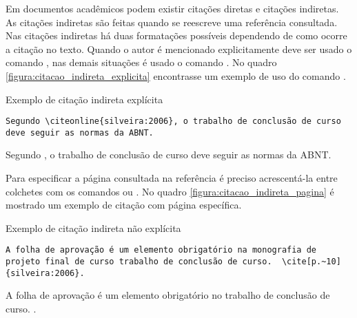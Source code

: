 Em documentos acadêmicos podem existir citações diretas e citações indiretas. As citações indiretas são feitas quando se reescreve uma referência consultada. Nas citações indiretas há duas formatações possíveis dependendo de como ocorre a citação no texto. Quando o autor é mencionado explicitamente  deve ser usado o comando , nas demais situações é usado o comando . No quadro \ref{figura:citacao_indireta_explicita} encontrasse um  exemplo de uso do comando .

\begin{quadro}[htb]
\caption{Exemplo de citação indireta explícita} \label{figura:citacao_indireta_explicita}
\hrulefill

\lstset{language=Tex, breaklines=true}
\begin{lstlisting}
Segundo \citeonline{silveira:2006}, o trabalho de conclusão de curso deve seguir as normas da ABNT.
\end{lstlisting}

\hrulefill

Segundo , o trabalho de conclusão de curso deve seguir as normas da ABNT.

\hrulefill

\end{quadro}

Para especificar a página consultada na referência é preciso acrescentá-la entre colchetes com os comandos  ou . No quadro \ref{figura:citacao_indireta_pagina} é mostrado um exemplo de citação com página específica.

\begin{quadro}[htb]
\caption{Exemplo de citação indireta não explícita} \label{figura:citacao_indireta_pagina}
\hrulefill

\lstset{language=Tex, breaklines=true}
\begin{lstlisting}
A folha de aprovação é um elemento obrigatório na monografia de projeto final de curso trabalho de conclusão de curso.  \cite[p.~10]{silveira:2006}.
\end{lstlisting}

\hrulefill

A folha de aprovação é um elemento obrigatório no trabalho de conclusão de curso.  \cite[p.~10]{silveira:2006:manual_tcc}.

\hrulefill

\end{quadro}

